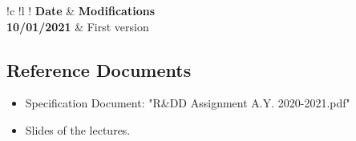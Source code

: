 \setlength\arrayrulewidth{1pt}
\setlength\LTleft{0pt}
\begin{longtable}{ !\Vline c !\Vline l !\Vline}
    \hline
    \textbf{Date}   & \textbf{Modifications}\\
    \textbf{10/01/2021}     & First version\\
    \hline
\end{longtable}


\subsection{Reference Documents}

\begin{itemize}
    \item Specification Document: "R\&DD Assignment A.Y. 2020-2021.pdf"
    \item Slides of the lectures.
\end{itemize}

\clearpage
